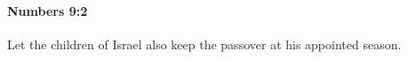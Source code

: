 
		\paragraph{Numbers 9:2} %
			\label{NUMBERS-9-2}

			Let the children of Israel also keep the passover at his appointed season.


